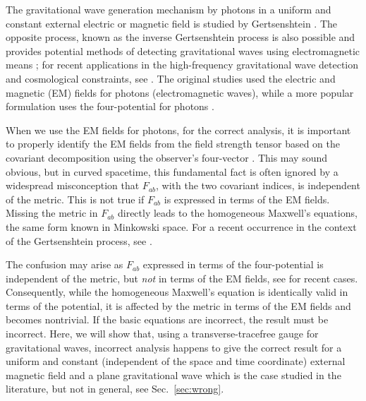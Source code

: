 \documentclass[twocolumn,amsmath,amssymb]{revtex4}
\begin{document}
The gravitational wave generation mechanism by photons in a uniform and constant external electric or magnetic field is studied by Gertsenshtein \cite{Gertsenshtein-1961}. The opposite process, known as the inverse Gertsenshtein process is also possible and provides potential methods of detecting gravitational waves using electromagnetic means \cite{Lupanov-1967, Boccaletti-1970, Zeldovich-1973, Zeldovich-Novikov-1983}; for recent applications in the high-frequency gravitational wave detection and cosmological constraints, see \cite{Aggarwal-2021, Domcke-2021, Vagnozzi-2022, Ramazanov-2023, Liu-2023}. The original studies used the electric and magnetic (EM) fields for photons (electromagnetic waves), while a more popular formulation uses the four-potential for photons \cite{Raffelt-1988}.

When we use the EM fields for photons, for the correct analysis, it is important to properly identify the EM fields from the field strength tensor based on the covariant decomposition using the observer's four-vector \cite{Moller-1952, Lichnerowicz-1967, Ellis-1973, EM-definition}. This may sound obvious, but in curved spacetime, this fundamental fact is often ignored by a widespread misconception that $F_{ab}$, with the two covariant indices, is independent of the metric. This is not true if $F_{ab}$ is expressed in terms of the EM fields. Missing the metric in $F_{ab}$ directly leads to the homogeneous Maxwell's equations, the same form known in Minkowski space. For a recent occurrence in the context of the Gertsenshtein process, see \cite{Palessandro-Rothman-2023}.

The confusion may arise as $F_{ab}$ expressed in terms of the four-potential is independent of the metric, but {\it not} in terms of the EM fields, see \cite{Berlin-2022, Domcke-2022} for recent cases. Consequently, while the homogeneous Maxwell's equation is identically valid in terms of the potential, it is affected by the metric in terms of the EM fields and becomes nontrivial. If the basic equations are incorrect, the result must be incorrect. Here, we will show that, using a transverse-tracefree gauge for gravitational waves, incorrect analysis happens to give the correct result for a uniform and constant (independent of the space and time coordinate) external magnetic field and a plane gravitational wave which is the case studied in the literature, but not in general, see Sec.\ \ref{sec:wrong}.
\end{document}
